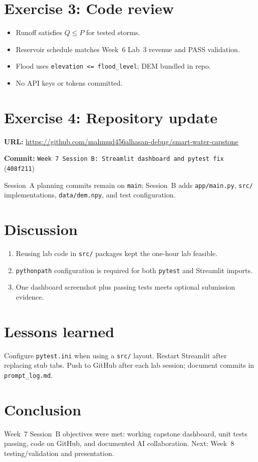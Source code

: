 \documentclass[11pt,a4paper]{article}
\newcommand{\capstonerepo}{https://github.com/mahmud456alhasan-debug/smart-water-capstone}
\begin{document}
\section{Exercise 3: Code review}
\begin{itemize}[noitemsep]
  \item Runoff satisfies $Q \le P$ for tested storms.
  \item Reservoir schedule matches Week~6 Lab~3 revenue and PASS validation.
  \item Flood uses \texttt{elevation <= flood\_level}; DEM bundled in repo.
  \item No API keys or tokens committed.
\end{itemize}

\section{Exercise 4: Repository update}
\textbf{URL:} \url{\capstonerepo}

\textbf{Commit:} \texttt{Week 7 Session B: Streamlit dashboard and pytest fix} (\texttt{408f211})

Session~A planning commits remain on \texttt{main}; Session~B adds \texttt{app/main.py}, \texttt{src/} implementations, \texttt{data/dem.npy}, and test configuration.

\section{Discussion}
\begin{enumerate}[noitemsep]
  \item Reusing lab code in \texttt{src/} packages kept the one-hour lab feasible.
  \item \texttt{pythonpath} configuration is required for both \texttt{pytest} and Streamlit imports.
  \item One dashboard screenshot plus passing tests meets optional submission evidence.
\end{enumerate}

\section{Lessons learned}
Configure \texttt{pytest.ini} when using a \texttt{src/} layout. Restart Streamlit after replacing stub tabs. Push to GitHub after each lab session; document commits in \texttt{prompt\_log.md}.

\section{Conclusion}
Week~7 Session~B objectives were met: working capstone dashboard, unit tests passing, code on GitHub, and documented AI collaboration. Next: Week~8 testing/validation and presentation.
\end{document}
